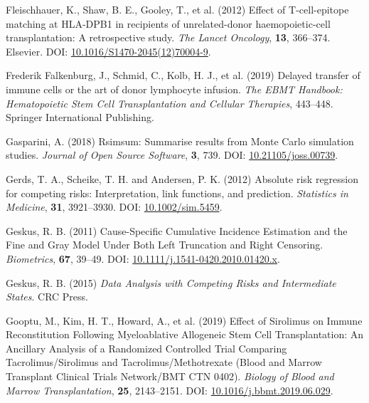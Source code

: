\documentclass[
  letterpaper,
  DIV=11,
  numbers=noendperiod]{scrreprt}
\newlength{\cslhangindent}
\newlength{\cslentryspacingunit} %
\newenvironment{CSLReferences}[2] %
 {%
  \setlength{\parindent}{0pt}
  \ifodd #1
  \let\oldpar\par
  \def\par{\hangindent=\cslhangindent\oldpar}
  \fi
  \setlength{\parskip}{#2\cslentryspacingunit}
 }%
 {}
\begin{document}
\begin{CSLReferences}{1}{0}
\leavevmode{}%
Fleischhauer, K., Shaw, B. E., Gooley, T., et al. (2012) Effect of
{T-cell-epitope} matching at {HLA-DPB1} in recipients of unrelated-donor
haemopoietic-cell transplantation: A retrospective study. \emph{The
Lancet Oncology}, \textbf{13}, 366--374. Elsevier. DOI:
\href{https://doi.org/10.1016/S1470-2045(12)70004-9}{10.1016/S1470-2045(12)70004-9}.

\leavevmode{}%
Frederik Falkenburg, J., Schmid, C., Kolb, H. J., et al. (2019) Delayed
transfer of immune cells or the art of donor lymphocyte infusion.
\emph{The EBMT Handbook: Hematopoietic Stem Cell Transplantation and
Cellular Therapies}, 443--448. Springer International Publishing.

\leavevmode{}%
Gasparini, A. (2018) Rsimsum: {Summarise} results from {Monte Carlo}
simulation studies. \emph{Journal of Open Source Software}, \textbf{3},
739. DOI:
\href{https://doi.org/10.21105/joss.00739}{10.21105/joss.00739}.

\leavevmode{}%
Gerds, T. A., Scheike, T. H. and Andersen, P. K. (2012) Absolute risk
regression for competing risks: Interpretation, link functions, and
prediction. \emph{Statistics in Medicine}, \textbf{31}, 3921--3930. DOI:
\href{https://doi.org/10.1002/sim.5459}{10.1002/sim.5459}.

\leavevmode{}%
Geskus, R. B. (2011) Cause-{Specific Cumulative Incidence Estimation}
and the {Fine} and {Gray Model Under Both Left Truncation} and {Right
Censoring}. \emph{Biometrics}, \textbf{67}, 39--49. DOI:
\href{https://doi.org/10.1111/j.1541-0420.2010.01420.x}{10.1111/j.1541-0420.2010.01420.x}.

\leavevmode{}%
Geskus, R. B. (2015) \emph{Data Analysis with Competing Risks and
Intermediate States}. CRC Press.

\leavevmode{}%
Gooptu, M., Kim, H. T., Howard, A., et al. (2019) Effect of {Sirolimus}
on {Immune Reconstitution Following Myeloablative Allogeneic Stem Cell
Transplantation}: {An Ancillary Analysis} of a {Randomized Controlled
Trial Comparing Tacrolimus}/{Sirolimus} and {Tacrolimus}/{Methotrexate}
({Blood} and {Marrow Transplant Clinical Trials Network}/{BMT CTN}
0402). \emph{Biology of Blood and Marrow Transplantation}, \textbf{25},
2143--2151. DOI:
\href{https://doi.org/10.1016/j.bbmt.2019.06.029}{10.1016/j.bbmt.2019.06.029}.


\end{CSLReferences}
\end{document}
